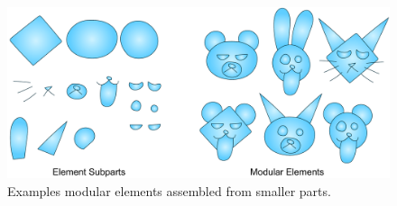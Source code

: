 \begin{figure}
\centering
\includegraphics[width=1.0\textwidth]{figures/conclusions/modular.pdf}
\caption[Modular elements]
{ \label{modular_element} 
\newtext
{
Examples  modular elements assembled from smaller parts.
}
}
\end{figure}

